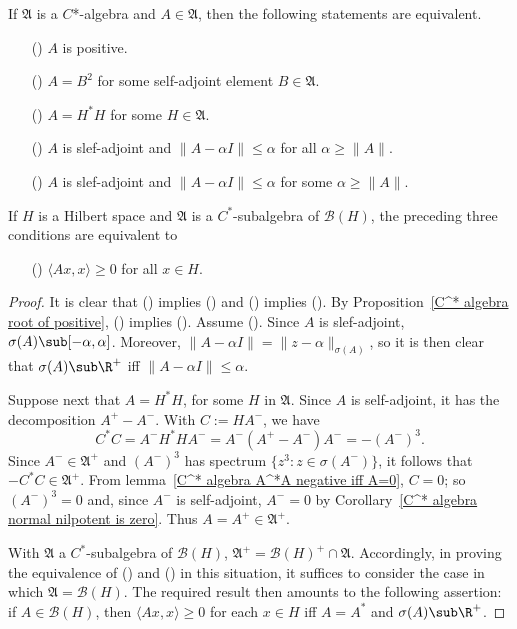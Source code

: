 \begin{theorem}\label{C^* algebra self-adjoint is positive iff}
If $\mathfrak{A}$ is a $C$*-algebra and $A\in\mathfrak{A}$, then the following statements are equivalent.
\begin{itemize}
\item[(\rmnum{1})] $A$ is positive.
\item[(\rmnum{2})] $A=B^2$ for some self-adjoint element $B\in\mathfrak{A}$.
\item[(\rmnum{3})] $A=H^*H$ for some $H\in\mathfrak{A}$.
\item[(\rmnum{4})] $A$ is slef-adjoint and $\|A-\alpha I\|\leq\alpha$ for all $\alpha\geq\|A\|$.
\item[(\rmnum{5})] $A$ is slef-adjoint and $\|A-\alpha I\|\leq\alpha$ for some $\alpha\geq\|A\|$. 
\end{itemize}
If $H$ is a Hilbert space and $\mathfrak{A}$ is a $C^*$-subalgebra of $\mathcal{B}(H)$, the preceding three conditions are equivalent to
\begin{itemize}
\item[(\rmnum{6})] $\langle Ax,x\rangle\geq 0$ for all $x\in H$.
\end{itemize}
\end{theorem}
\begin{proof}
It is clear that () implies () and () implies (). By Proposition~\ref{C^* algebra root of positive}, () implies (). Assume (). Since $A$ is slef-adjoint, $\sigma(A)\sub[-\alpha,\alpha]$. Moreover, $\|A-\alpha I\|=\|z-\alpha\|_{\sigma(A)}$, so it is then clear that $\sigma(A)\sub\R^+$ iff $\|A-\alpha I\|\leq\alpha$.\par
Suppose next that $A=H^*H$, for some $H$ in $\mathfrak{A}$. Since $A$ is self-adjoint, it has the decomposition $A^+-A^-$. With $C:=HA^-$, we have
\[C^*C=A^-H^*HA^-=A^-(A^+-A^-)A^-=-(A^-)^3.\]
Since $A^-\in\mathfrak{A}^+$ and $(A^-)^3$ has spectrum $\{z^3:z\in\sigma(A^-)\}$, it follows that $-C^*C\in\mathfrak{A}^+$. From lemma~\ref{C^* algebra A^*A negative iff A=0}, $C=0$; so $(A^-)^3=0$ and, since $A^-$ is self-adjoint, $A^-=0$ by Corollary~\ref{C^* algebra normal nilpotent is zero}. Thus $A=A^+\in\mathfrak{A}^+$.\par
With $\mathfrak{A}$ a $C^*$-subalgebra of $\mathcal{B}(H)$, $\mathfrak{A}^+=\mathcal{B}(H)^+\cap\mathfrak{A}$. Accordingly, in proving the equivalence of () and () in this situation, it suffices to consider the case in which $\mathfrak{A}=\mathcal{B}(H)$. The required result then amounts to the following assertion: if $A\in\mathcal{B}(H)$, then $\langle Ax,x\rangle\geq 0$ for each $x\in H$ iff $A=A^*$ and $\sigma(A)\sub\R^+$.
\end{proof}
